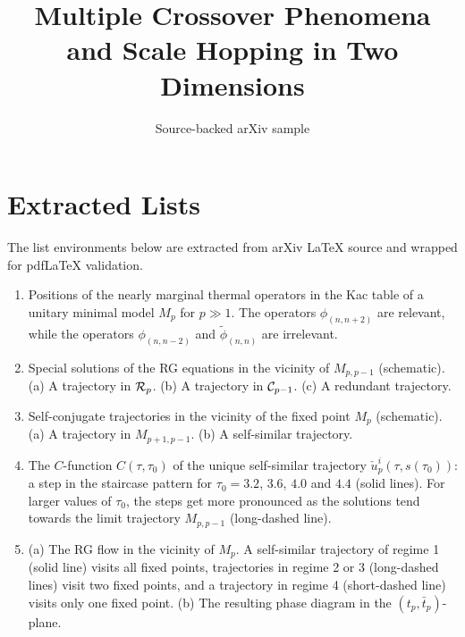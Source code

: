 \documentclass[11pt]{article}
\title{Multiple Crossover Phenomena and Scale Hopping in Two Dimensions}
\author{Source-backed arXiv sample}
\date{}
\begin{document}
\maketitle
\section{Extracted Lists}

The list environments below are extracted from arXiv LaTeX source and wrapped for pdfLaTeX validation.

\begin{enumerate}

\item Positions of the nearly marginal thermal operators in the Kac table of a
unitary  minimal model $M_p$ for $p \gg 1$. The operators
$\phi_{(n,n+2)}$ are  relevant, while the operators
$\phi_{(n,n-2)}$ and $\tilde \phi_{(n,n)}$ are irrelevant.

\item Special solutions of the RG equations in the vicinity of $M_{p,p-1}$
(schematic).
(a) A trajectory in ${\cal R}_p$.
(b) A trajectory in ${\cal C}_{p-1}$.
(c) A redundant trajectory.

\item Self-conjugate trajectories in the vicinity of the fixed point $M_p$
(schematic).
(a) A trajectory in $M_{p+1,p-1}$.
(b) A self-similar trajectory.

\item The $C$-function $C(\tau,\tau_0)$ of the unique self-similar trajectory
$\check u_{p}^i(\tau,s(\tau_0))$: a step in the staircase pattern for   $\tau_0
= 3.2$, $3.6$, $4.0$ and $4.4$ (solid lines). For larger values of  $\tau_0$,
the steps get more pronounced as the solutions tend towards the limit
trajectory $M_{p,p-1}$ (long-dashed line).

\item
(a) The RG flow in the vicinity of $M_p$. A self-similar trajectory of regime 1
(solid line) visits all fixed points, trajectories in regime 2 or 3
(long-dashed lines) visit two fixed points, and a trajectory in regime 4
(short-dashed line) visits only one fixed point.
(b) The resulting phase diagram in the $(t_{p}, \bar t_{p})$-plane.

\end{enumerate}
\end{document}
